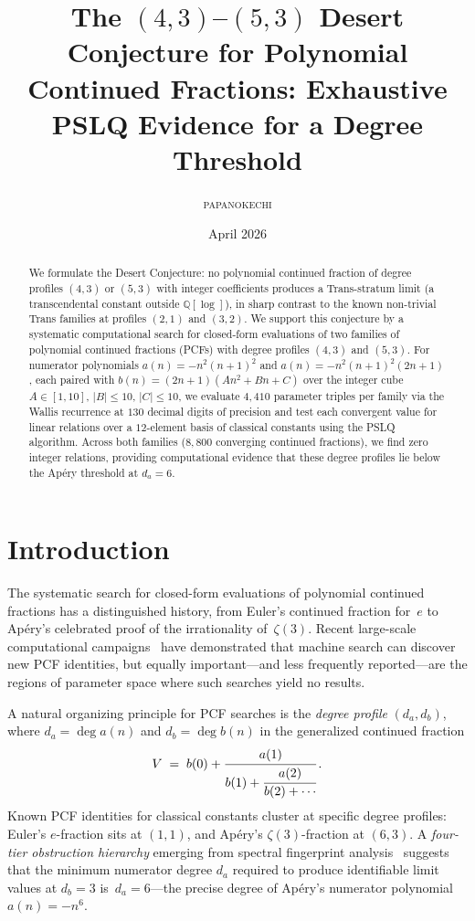 \documentclass[11pt]{amsart}
\title[The $(4,3)$--$(5,3)$ Desert Conjecture]%
{The $(4,3)$--$(5,3)$ Desert Conjecture for Polynomial
Continued Fractions: Exhaustive PSLQ Evidence for a
Degree Threshold}
\author{\textsc{papanokechi}}
\date{April 2026}
\theoremstyle{plain}
\theoremstyle{remark}
\begin{document}
\begin{abstract}
We formulate the Desert Conjecture: no polynomial
continued fraction of degree profiles $(4,3)$ or $(5,3)$
with integer coefficients produces a Trans-stratum limit
(a transcendental constant outside $\mathbb{Q}[\log]$),
in sharp contrast to the known non-trivial Trans families
at profiles $(2,1)$ and $(3,2)$.
We support this conjecture by a systematic computational search for closed-form evaluations
of two families of polynomial continued fractions (PCFs) with degree
profiles $(4,3)$ and $(5,3)$.
For numerator polynomials $a(n) = -n^2(n+1)^2$ and
$a(n) = -n^2(n+1)^2(2n+1)$, each paired with
$b(n) = (2n+1)(An^2 + Bn + C)$ over the integer cube
$A \in [1,10]$, $|B| \leq 10$, $|C| \leq 10$,
we evaluate $4{,}410$ parameter triples per family via the
Wallis recurrence at $130$ decimal digits of precision
and test each convergent value for linear relations over a
$12$-element basis of classical constants using the PSLQ algorithm.
Across both families ($8{,}800$ converging continued fractions),
we find zero integer relations,
providing computational evidence that these degree profiles
lie below the Ap\'ery threshold at $d_a = 6$.
\end{abstract}

\maketitle

\section{Introduction}

The systematic search for closed-form evaluations of polynomial
continued fractions has a distinguished history, from Euler's
continued fraction for~$e$ to Ap\'ery's celebrated proof of
the irrationality of~$\zeta(3)$.
Recent large-scale computational campaigns~\cite{raayoni2021}
have demonstrated that machine search can discover new PCF identities,
but equally important---and less frequently reported---are the
regions of parameter space where such searches yield no results.

A natural organizing principle for PCF searches is the
\emph{degree profile} $(d_a, d_b)$,
where $d_a = \deg a(n)$ and $d_b = \deg b(n)$ in the
generalized continued fraction
\begin{equation}\label{eq:gcf}
  V \;=\; b(0) + \cfrac{a(1)}{b(1)
    + \cfrac{a(2)}{b(2) + \cdots}}\,.
\end{equation}
Known PCF identities for classical constants cluster at specific
degree profiles:
Euler's $e$-fraction sits at $(1,1)$,
and Ap\'ery's $\zeta(3)$-fraction at $(6,3)$.
A \emph{four-tier obstruction hierarchy} emerging from spectral
fingerprint analysis~\cite{spectral}
suggests that the minimum numerator degree $d_a$ required to
produce identifiable limit values at $d_b = 3$ is~$d_a = 6$---the
precise degree of Ap\'ery's numerator polynomial $a(n) = -n^6$.
\end{document}
